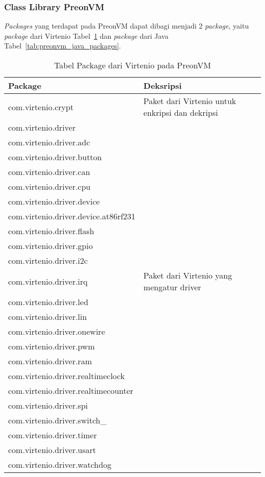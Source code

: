 \subsubsection{Class Library PreonVM}
\label{subsubsec:library}
{\it Packages} yang terdapat pada PreonVM dapat dibagi menjadi 2 {\it package}, yaitu {\it package} dari Virtenio Tabel~\ref{tab:preonvm_virtenio_packages} dan {\it package} dari Java Tabel~\ref{tab:preonvm_java_packages}.
\begin{table}[H] %
	\centering 
	\caption{Tabel Package dari Virtenio pada PreonVM}
	\label{tab:preonvm_virtenio_packages}
	\begin{tabular}{|p{8cm}|p{8cm}|}
	\hline
		Package & Deksripsi \\
    \hline
com.virtenio.crypt	 & Paket dari Virtenio untuk enkripsi dan dekripsi \\
com.virtenio.driver	 &\\
com.virtenio.driver.adc	 &\\
com.virtenio.driver.button	 &\\
com.virtenio.driver.can	 &\\
com.virtenio.driver.cpu	 &\\
com.virtenio.driver.device	 &\\
com.virtenio.driver.device.at86rf231	 &\\
com.virtenio.driver.flash	 &\\
com.virtenio.driver.gpio	 &\\
com.virtenio.driver.i2c	 &\\
com.virtenio.driver.irq	 & Paket dari Virtenio yang mengatur driver\\
com.virtenio.driver.led	 &\\
com.virtenio.driver.lin	 &\\
com.virtenio.driver.onewire	 &\\
com.virtenio.driver.pwm	 &\\
com.virtenio.driver.ram	 &\\
com.virtenio.driver.realtimeclock	 &\\
com.virtenio.driver.realtimecounter	 &\\
com.virtenio.driver.spi	 &\\
com.virtenio.driver.switch\_ &\\
com.virtenio.driver.timer	 &\\
com.virtenio.driver.usart	 &\\
com.virtenio.driver.watchdog	 &\\
\hline
\end{tabular}
\end{table}

